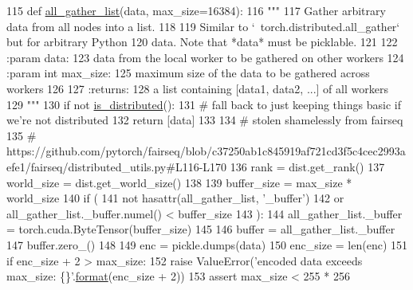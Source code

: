 \begin{DoxyCode}
115 \textcolor{keyword}{def }\hyperlink{namespaceparlai_1_1utils_1_1distributed_a9ef5bf0debf512ddbeb045327bfd87ef}{all\_gather\_list}(data, max\_size=16384):
116     \textcolor{stringliteral}{"""}
117 \textcolor{stringliteral}{    Gather arbitrary data from all nodes into a list.}
118 \textcolor{stringliteral}{}
119 \textcolor{stringliteral}{    Similar to `~torch.distributed.all\_gather` but for arbitrary Python}
120 \textcolor{stringliteral}{    data. Note that *data* must be picklable.}
121 \textcolor{stringliteral}{}
122 \textcolor{stringliteral}{    :param data:}
123 \textcolor{stringliteral}{        data from the local worker to be gathered on other workers}
124 \textcolor{stringliteral}{    :param int max\_size:}
125 \textcolor{stringliteral}{        maximum size of the data to be gathered across workers}
126 \textcolor{stringliteral}{}
127 \textcolor{stringliteral}{    :returns:}
128 \textcolor{stringliteral}{        a list containing [data1, data2, ...] of all workers}
129 \textcolor{stringliteral}{    """}
130     \textcolor{keywordflow}{if} \textcolor{keywordflow}{not} \hyperlink{namespaceparlai_1_1utils_1_1distributed_a023acb5e3b66e1f27e21247c35661279}{is\_distributed}():
131         \textcolor{comment}{# fall back to just keeping things basic if we're not distributed}
132         \textcolor{keywordflow}{return} [data]
133 
134     \textcolor{comment}{# stolen shamelessly from fairseq}
135     \textcolor{comment}{#
       https://github.com/pytorch/fairseq/blob/c37250ab1c845919af721cd3f5c4cec2993aefe1/fairseq/distributed\_utils.py#L116-L170}
136     rank = dist.get\_rank()
137     world\_size = dist.get\_world\_size()
138 
139     buffer\_size = max\_size * world\_size
140     \textcolor{keywordflow}{if} (
141         \textcolor{keywordflow}{not} hasattr(all\_gather\_list, \textcolor{stringliteral}{'\_buffer'})
142         \textcolor{keywordflow}{or} all\_gather\_list.\_buffer.numel() < buffer\_size
143     ):
144         all\_gather\_list.\_buffer = torch.cuda.ByteTensor(buffer\_size)
145 
146     buffer = all\_gather\_list.\_buffer
147     buffer.zero\_()
148 
149     enc = pickle.dumps(data)
150     enc\_size = len(enc)
151     \textcolor{keywordflow}{if} enc\_size + 2 > max\_size:
152         \textcolor{keywordflow}{raise} ValueError(\textcolor{stringliteral}{'encoded data exceeds max\_size: \{\}'}.\hyperlink{namespaceparlai_1_1chat__service_1_1services_1_1messenger_1_1shared__utils_a32e2e2022b824fbaf80c747160b52a76}{format}(enc\_size + 2))
153     \textcolor{keyword}{assert} max\_size < 255 * 256

\end{DoxyCode}
